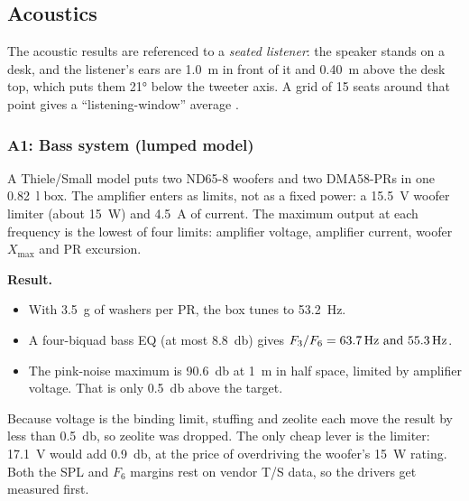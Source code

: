 \subsection{Acoustics}

The acoustic results are referenced to a \emph{seated listener}: the speaker stands on a desk, and the listener's ears are \qty{1.0}{\metre} in front of it and \qty{0.40}{\metre} above the desk top, which puts them \ang{21} below the tweeter axis. A grid of 15 seats around that point gives a ``listening-window'' average .

\subsubsection{A1: Bass system (lumped model)}\label{sec:a1}

A Thiele/Small model puts two ND65-8 woofers and two DMA58-PRs in one \qty{0.82}{\litre} box. The amplifier enters as limits, not as a fixed power: a \qty{15.5}{\volt} woofer limiter (about \qty{15}{\watt}) and \qty{4.5}{\ampere} of current. The maximum output at each frequency is the lowest of four limits: amplifier voltage, amplifier current, woofer $X_\text{max}$ and PR excursion.

\textbf{Result.}
\begin{itemize}
  \item With \qty{3.5}{\gram} of washers per PR, the box tunes to \qty{53.2}{\hertz}.
  \item A four-biquad bass EQ (at most \qty{+8.8}{\decibel}) gives $F_3/F_6 = \qtylist{63.7;55.3}{\hertz}$.
  \item The pink-noise maximum is \qty{90.6}{\decibel} at \qty{1}{\metre} in half space, limited by amplifier voltage. That is only \qty{0.5}{\decibel} above the target.
\end{itemize}
Because voltage is the binding limit, stuffing and zeolite each move the result by less than \qty{0.5}{\decibel}, so zeolite was dropped. The only cheap lever is the limiter: \qty{17.1}{\volt} would add \qty{0.9}{\decibel}, at the price of overdriving the woofer's \qty{15}{\watt} rating. Both the SPL and $F_6$ margins rest on vendor T/S data, so the drivers get measured first.

